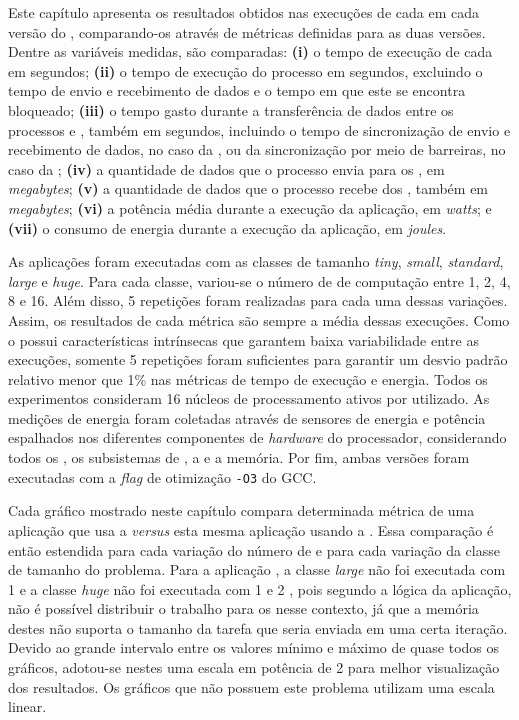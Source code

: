 Este capítulo apresenta os resultados obtidos nas execuções de cada  em cada versão do \capb, comparando-os através de métricas definidas para as duas versões. Dentre as variáveis medidas, são comparadas: \textbf{(i)} o tempo de execução de cada \CC em segundos; \textbf{(ii)} o tempo de execução do processo \master em segundos, excluindo o tempo de envio e recebimento de dados e o tempo em que este se encontra bloqueado; \textbf{(iii)} o tempo gasto durante a transferência de dados entre os processos \master e \slave, também em segundos, incluindo o tempo de sincronização de envio e recebimento de dados, no caso da \IPC, ou da sincronização por meio de barreiras, no caso da \ASYNC; \textbf{(iv)} a quantidade de dados que o processo \master envia para os \slaves, em \textit{megabytes}; \textbf{(v)} a quantidade de dados que o processo \master recebe dos \slaves, também em \textit{megabytes}; \textbf{(vi)} a potência média durante a execução da aplicação, em \textit{watts}; e \textbf{(vii)} o consumo de energia durante a execução da aplicação, em \textit{joules}.

As aplicações foram executadas com as classes de tamanho \textit{tiny}, \textit{small}, \textit{standard}, \textit{large} e \textit{huge}. Para cada classe, variou-se o número de \clusters de computação entre 1, 2, 4, 8 e 16. Além disso, 5 repetições foram realizadas para cada uma dessas variações. Assim, os resultados de cada métrica são sempre a média dessas execuções. Como o \mppa possui características intrínsecas que garantem baixa variabilidade entre as execuções, somente 5 repetições foram suficientes para garantir um desvio padrão relativo menor que 1\% nas métricas de tempo de execução e energia. Todos os experimentos consideram 16 núcleos de processamento ativos por \cluster utilizado. As medições de energia foram coletadas através de sensores de energia e potência espalhados nos diferentes componentes de \textit{hardware} do processador, considerando todos os \clusters, os subsistemas de \IO, a \NoC e a memória. Por fim, ambas versões foram executadas com a \textit{flag} de otimização \texttt{-O3} do GCC.

Cada gráfico mostrado neste capítulo compara determinada métrica de uma aplicação que usa a \API \ASYNC \textit{versus} esta mesma aplicação usando a \API \IPC. Essa comparação é então estendida para cada variação do número de \clusters e para cada variação da classe de tamanho do problema. Para a aplicação \KM, a classe \textit{large} não foi executada com 1 \cluster e a classe \textit{huge} não foi executada com 1 e 2 \clusters, pois segundo a lógica da aplicação, não é possível distribuir o trabalho para os \clusters nesse contexto, já que a memória destes não suporta o tamanho da tarefa que seria enviada em uma certa iteração. Devido ao grande intervalo entre os valores mínimo e máximo de quase todos os gráficos, adotou-se nestes uma escala em potência de 2 para melhor visualização dos resultados. Os gráficos que não possuem este problema utilizam uma escala linear.

